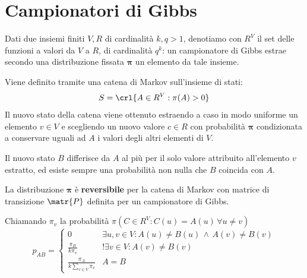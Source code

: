 \documentclass[\main/main.tex]{subfiles}
\begin{document}
\section{Campionatori di Gibbs}
Dati due insiemi finiti \(V, R\) di cardinalità \(k, q > 1\), denotiamo con \(R^V\) il set delle funzioni a valori da \(V\) a \(R\), di cardinalità \(q^k\): un campionatore di Gibbs estrae secondo una distribuzione fissata \(\bm{\pi} \) un elemento da tale insieme.

Viene definito tramite una catena di Markov sull'insieme di stati:
\[
  S = \crl{A \in R^V: \pi(A) > 0}
\]
Il nuovo stato della catena viene ottenuto estraendo a caso in modo uniforme un elemento \(v \in V\) e scegliendo un nuovo valore \(c \in R\) con probabilità \(\bm{\pi} \) condizionata a conservare uguali ad \(A\) i valori degli altri elementi di \(V\).

Il nuovo stato \(B\) differisce da \(A\) al più per il solo valore attribuito all'elemento \(v\) estratto, ed esiste sempre una probabilità non nulla che \(B\) coincida con \(A\).

\begin{theorem}
  La distribuzione \(\bm{\pi} \) è \textbf{reversibile} per la catena di Markov con matrice di transizione \(\matr{P}\) definita per un campionatore di Gibbs.

  Chiamando \(\pi_v\) la probabilità \(\pi(C \in R^V: C(u) = A(u) \, \forall u \neq v)\)
  \[
    p_{AB} = \begin{cases}
      0                                  & \exists u, v \in V: A(u) \neq B(u) \, \land \, A(v) \neq B(v) \\
      \frac{\pi_B}{k\pi_v}               & !\exists v \in V: A(v) \neq B(v)                              \\
      \frac{\pi_A}{k\sum_{v \in V}\pi_v} & A = B
    \end{cases}
  \]
\end{theorem}
\end{document}
